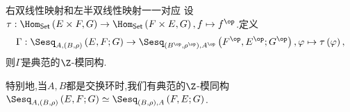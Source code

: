 \begin{proposition}{右双线性映射和左半双线性映射一一对应}{}
	设$\tau:\Hom_{\mathsf{Set}}\left(E\times F,G\right)\to\Hom_{\mathsf{Set}}\left(F\times E,G\right),f\mapsto f^{\op}$.定义
	\begin{align*}
		\Gamma:\Sesq_{A,(B,\rho)}\left(E,F;G\right)\to\Sesq_{(B^{\op},\rho^{\op}),A^{\op}}\left(F^{\op},E^{\op};G^{\op}\right),\varphi\mapsto\tau\left(\varphi\right),
	\end{align*}
	则$\Gamma$是典范的$\Z$-模同构.
\end{proposition}

\begin{remark}{}{}
	特别地,当$A,B$都是交换环时,我们有典范的$\Z$-模同构$\Sesq_{A,(B,\rho)}\left(E,F;G\right)\simeq\Sesq_{(B,\rho),A}\left(F,E;G\right)$.
\end{remark}




















